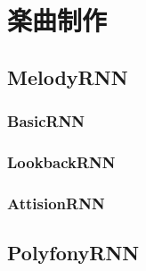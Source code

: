 \chapter{楽曲制作}
\section{MelodyRNN}

\subsection{BasicRNN}

\subsection{LookbackRNN}

\subsection{AttisionRNN}

\section{PolyfonyRNN}
